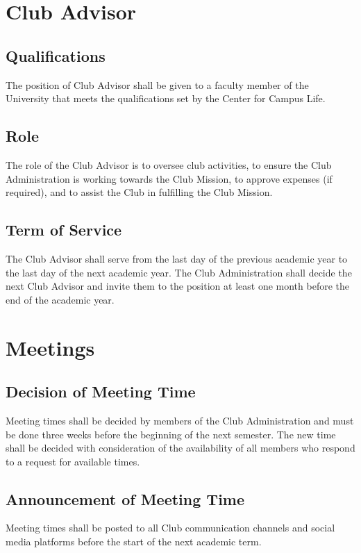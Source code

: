 \documentclass[english,11pt]{article}
\begin{document}
\section{Club Advisor} \label{art:advisor}

\subsection{Qualifications} \label{sect:advisor:qualifications}
The position of Club Advisor shall be given to a faculty member of the University that meets the qualifications set by the Center for Campus Life.

\subsection{Role} \label{sect:advisor:role}
The role of the Club Advisor is to oversee club activities, to ensure the Club Administration is working towards the Club Mission, to approve expenses (if required), and to assist the Club in fulfilling the Club Mission.

\subsection{Term of Service} \label{sect:advisor:term}
The Club Advisor shall serve from the last day of the previous academic year to the last day of the next academic year.
The Club Administration shall decide the next Club Advisor and invite them to the position at least one month before the end of the academic year.

\section{Meetings} \label{art:meetings}

\subsection{Decision of Meeting Time} \label{sect:meetings:decision}
Meeting times shall be decided by members of the Club Administration and must be done three weeks before the beginning of the next semester.
The new time shall be decided with consideration of the availability of all members who respond to a request for available times.

\subsection{Announcement of Meeting Time} \label{sect:meetings:announcement}
Meeting times shall be posted to all Club communication channels and social media platforms before the start of the next academic term.
\end{document}
